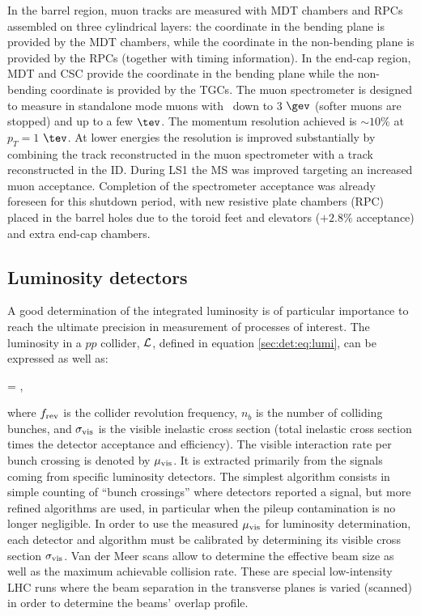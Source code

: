 \ei

In the barrel region, muon tracks are measured with MDT chambers and RPCs assembled on three cylindrical layers: the coordinate in the bending plane is provided by the MDT chambers, while the coordinate in the non-bending plane is provided by the RPCs (together with timing information). In the end-cap region, MDT and CSC provide the coordinate in the bending plane while the non-bending coordinate is provided by the TGCs. The muon spectrometer is designed to measure in standalone mode muons with \pt\ down to 3 $\gev$ (softer muons are stopped) and up to a few $\tev$. The momentum resolution achieved is $\sim10\%$ at $p_{T}= 1$ $\tev$. At lower energies the resolution is improved substantially by combining the track reconstructed in the muon spectrometer with a track reconstructed in the ID.
During LS1 the MS was improved targeting an increased muon acceptance. Completion of the spectrometer acceptance was already foreseen for this shutdown period, with new resistive plate chambers (RPC) placed in the barrel holes due to the toroid feet and elevators ($+2.8\%$ acceptance) and extra end-cap chambers.

\subsection{Luminosity detectors}

A good determination of the integrated luminosity is of particular importance to reach the ultimate precision in measurement of processes of interest. The luminosity in a $pp$ collider, $\mathcal{L}$, defined in equation \ref{sec:det:eq:lumi}, can be expressed as well as:

\be
\lag = ,
\label{sec:det:eq:lumidect}
\ee

\noindent where $f_{\rm rev}$ is the collider revolution frequency, $n_{b}$ is the number of colliding bunches, and $\sigma_{\rm vis}$ is the visible inelastic cross section (total inelastic cross section times the detector acceptance and efficiency). The visible interaction rate per bunch crossing is denoted by $\mu_{\rm vis}$. It is extracted primarily from the signals coming from specific luminosity detectors. The simplest algorithm consists in simple counting of ``bunch crossings'' where detectors reported a signal, but more refined algorithms are used, in particular when the pileup contamination is no longer negligible. In order to use the measured $\mu_{\rm vis}$ for luminosity determination, each detector and algorithm must be calibrated by determining its visible cross section $\sigma_{\rm vis}$. Van der Meer scans allow to determine the effective beam size as well as the maximum achievable collision rate. These are special low-intensity LHC runs where the beam separation in the transverse planes is varied (scanned) in order to determine the beams' overlap profile.

